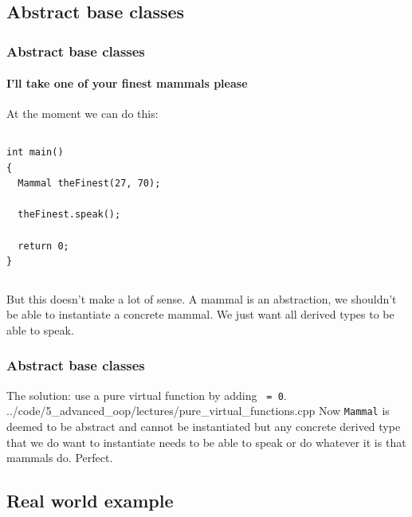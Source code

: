 \documentclass[handout]{beamer}
\begin{document}
\subsection{Abstract base classes}

\begin{frame}[fragile]
  \frametitle{Abstract base classes}
  \framesubtitle{I'll take one of  your finest mammals please}
  
  At the moment we can do this:
  \begin{columns}[t]
    \begin{column}[T]{0.48\linewidth}
  		\begin{lstlisting}[aboveskip=0pt]
int main()
{
  Mammal theFinest(27, 70);
  
  theFinest.speak();
  
  return 0;
}
			\end{lstlisting}
		\end{column}
		\begin{column}[T]{0.48\linewidth}
		\end{column}
	\end{columns}
	But this doesn't make a lot of sense.  A mammal is an abstraction, we shouldn't be able to instantiate a concrete mammal.  We just want all derived types to be able to speak.

\end{frame}

\begin{frame}[fragile]
  \frametitle{Abstract base classes}
  
  The solution: use a pure virtual function by adding \texttt{ = 0}.
  	{../code/5_advanced_oop/lectures/pure_virtual_functions.cpp}
  	\pause
  Now \texttt{Mammal} is deemed to be abstract and cannot be instantiated but any concrete derived type that we do want to instantiate needs to be able to speak or do whatever it is that mammals do. Perfect.

\end{frame}

\subsection{Real world example}
\end{document}
